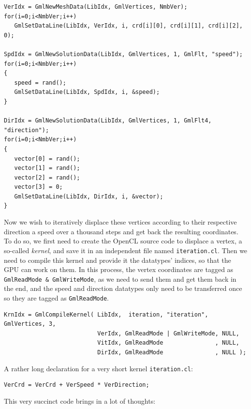 \documentclass[a4paper,12pt]{article}
\begin{document}
\begin{tt}
\begin{verbatim}
VerIdx = GmlNewMeshData(LibIdx, GmlVertices, NmbVer);
for(i=0;i<NmbVer;i++)
   GmlSetDataLine(LibIdx, VerIdx, i, crd[i][0], crd[i][1], crd[i][2], 0);

SpdIdx = GmlNewSolutionData(LibIdx, GmlVertices, 1, GmlFlt, "speed");
for(i=0;i<NmbVer;i++)
{
   speed = rand();
   GmlSetDataLine(LibIdx, SpdIdx, i, &speed);
}

DirIdx = GmlNewSolutionData(LibIdx, GmlVertices, 1, GmlFlt4, "direction");
for(i=0;i<NmbVer;i++)
{
   vector[0] = rand();
   vector[1] = rand();
   vector[2] = rand();
   vector[3] = 0;
   GmlSetDataLine(LibIdx, DirIdx, i, &vector);
}
\end{verbatim}
\end{tt}
\normalfont

Now we wish to iteratively displace these vertices according to their respective direction a speed over a thousand steps and get back the resulting coordinates.
To do so, we first need to create the OpenCL source code to displace a vertex, a so-called \emph{kernel}, and save it in an independent file named {\tt iteration.cl}.
Then we need to compile this kernel and provide it the datatypes' indices, so that the GPU can work on them. In this process, the vertex coordinates are tagged as {\tt GmlReadMode \& GmlWriteMode}, as we need to send them and get them back in the end, and the speed and direction datatypes only need to be transferred once so they are tagged as {\tt GmlReadMode}.

\begin{tt}
\begin{verbatim}
KrnIdx = GmlCompileKernel( LibIdx,  iteration, "iteration", GmlVertices, 3,
                           VerIdx, GmlReadMode | GmlWriteMode, NULL,
                           VitIdx, GmlReadMode               , NULL,
                           DirIdx, GmlReadMode               , NULL );
\end{verbatim}
\end{tt}
\normalfont

A rather long declaration for a very short kernel {\tt iteration.cl}:

\begin{tt}
\begin{verbatim}
VerCrd = VerCrd + VerSpeed * VerDirection;
\end{verbatim}
\end{tt}
\normalfont

This very succinct code brings in a lot of thoughts:
\end{document}
